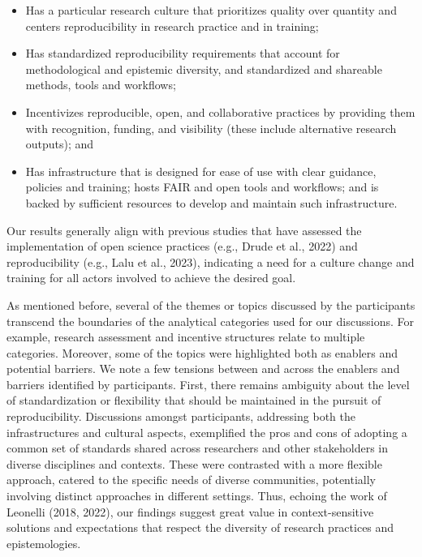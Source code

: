 \documentclass[authordate, meta]{jote-new-article}
\begin{document}
	\begin{itemize}


		\item Has a particular research culture that prioritizes quality over quantity and centers reproducibility in research practice and in training;



		\item
		Has standardized reproducibility requirements that account for methodological and epistemic diversity, and standardized and shareable methods, tools and workflows;



		\item Incentivizes reproducible, open, and collaborative practices by providing them with recognition, funding, and visibility (these include alternative research outputs); and



		\item
		Has infrastructure that is designed for ease of use with clear guidance, policies and training; hosts FAIR and open tools and workflows; and is backed by sufficient resources to develop and maintain such infrastructure.


	\end{itemize}





	Our results generally align with previous studies that have assessed the implementation of open science practices (e.g., Drude et al., 2022) and reproducibility (e.g., Lalu et al., 2023), indicating a need for a culture change and training for all actors involved to achieve the desired goal.







	As mentioned before, several of the themes or topics discussed by the participants transcend the boundaries of the analytical categories used for our discussions. For example, research assessment and incentive structures relate to multiple categories. Moreover, some of the topics were highlighted both as enablers and potential barriers. We note a few tensions between and across the enablers and barriers identified by participants. First, there remains ambiguity about the level of standardization or flexibility that should be maintained in the pursuit of reproducibility. Discussions amongst participants, addressing both the infrastructures and cultural aspects, exemplified the pros and cons of adopting a common set of standards shared across researchers and other stakeholders in diverse disciplines and contexts. These were contrasted with a more flexible approach, catered to the specific needs of diverse communities, potentially involving distinct approaches in different settings. Thus, echoing the work of Leonelli (2018, 2022), our findings suggest great value in context-sensitive solutions and expectations that respect the diversity of research practices and epistemologies.
\end{document}
